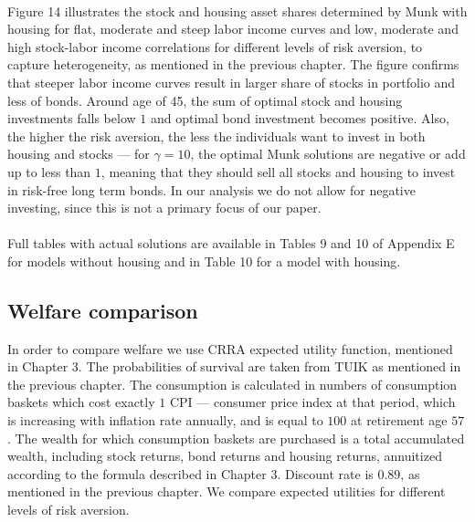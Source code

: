 \documentclass[]{article}
\begin{document}
\paragraph{}Figure 14 illustrates the stock and housing asset shares determined by Munk with housing for flat, moderate and steep labor income curves and low, moderate and high stock-labor income correlations for different levels of risk aversion, to capture heterogeneity, as mentioned in the previous chapter. The figure confirms that steeper labor income curves result in larger share of stocks in portfolio and less of bonds. Around age of 45, the sum of optimal stock and housing investments falls below $1$ and optimal bond investment becomes positive. Also, the higher the risk aversion, the less the individuals want to invest in both housing and stocks --- for $\gamma=10$, the optimal Munk solutions are negative or add up to less than $1$, meaning that they should sell all stocks and housing to invest in risk-free long term bonds. In our analysis we do not allow for negative investing, since this is not a primary focus of our paper.  



\paragraph{}Full tables with actual solutions are available in Tables 9 and 10 of Appendix E for models without housing and in Table 10 for a model with housing. 


\subsection{Welfare comparison}

In order to compare welfare we use CRRA expected utility function, mentioned in Chapter 3. The probabilities of survival are taken from TUIK as mentioned in the previous chapter. The consumption is calculated in numbers of consumption baskets which cost exactly $1$ CPI --- consumer price index at that period, which is increasing with inflation rate annually, and is equal to $100$ at retirement age $57$. The wealth for which consumption baskets are purchased is a total accumulated wealth, including stock returns, bond returns and housing returns, annuitized according to the formula described in Chapter 3. Discount rate is $0.89$, as mentioned in the previous chapter. We compare expected utilities for different levels of risk aversion.
\end{document}
